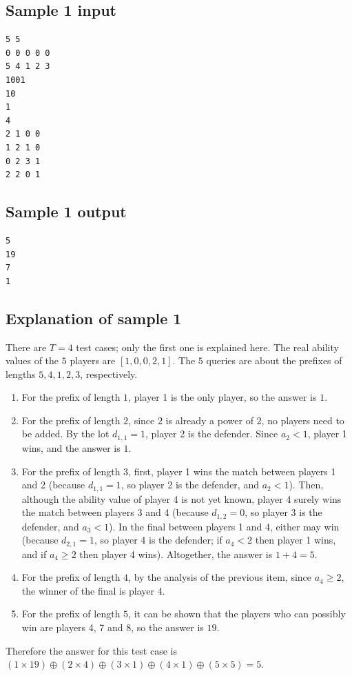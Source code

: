 \documentclass[11pt]{article}
\begin{document}
\subsection*{Sample 1 input}

\begin{verbatim}
5 5
0 0 0 0 0
5 4 1 2 3
1001
10
1
4
2 1 0 0
1 2 1 0
0 2 3 1
2 2 0 1
\end{verbatim}

\subsection*{Sample 1 output}

\begin{verbatim}
5
19
7
1
\end{verbatim}

\subsection*{Explanation of sample 1}

There are $T = 4$ test cases; only the first one is explained here.
The real ability values of the $5$ players are $[1, 0, 0, 2, 1]$.
The $5$ queries are about the prefixes of lengths $5, 4, 1, 2, 3$,
respectively.
\begin{enumerate}
\item For the prefix of length $1$, player 1 is the only player, so the
answer is $1$.
\item For the prefix of length $2$, since $2$ is already a power of $2$, no
players need to be added.
By the lot $d_{1,1} = 1$, player 2 is the defender.
Since $a_2 < 1$, player 1 wins, and the answer is $1$.
\item For the prefix of length $3$, first, player 1 wins the match between
players 1 and 2 (because $d_{1,1} = 1$, so player 2 is the defender, and
$a_2 < 1$).
Then, although the ability value of player 4 is not yet known, player 4
surely wins the match between players 3 and 4 (because $d_{1,2} = 0$, so
player 3 is the defender, and $a_3 < 1$).
In the final between players 1 and 4, either may win (because
$d_{2,1} = 1$, so player 4 is the defender; if $a_4 < 2$ then player 1
wins, and if $a_4 \ge 2$ then player 4 wins).
Altogether, the answer is $1 + 4 = 5$.
\item For the prefix of length $4$, by the analysis of the previous item,
since $a_4 \ge 2$, the winner of the final is player 4.
\item For the prefix of length $5$, it can be shown that the players who
can possibly win are players 4, 7 and 8, so the answer is $19$.
\end{enumerate}
Therefore the answer for this test case is
$(1 \times 19) \oplus (2 \times 4) \oplus (3 \times 1) \oplus (4 \times 1)
\oplus (5 \times 5) = 5$.
\end{document}
